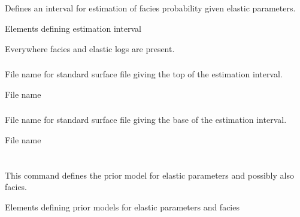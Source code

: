 \subsection{}
 \slist
   \item \Description Defines an interval for estimation of facies probability given elastic parameters.
   \item \Argument Elements defining estimation interval
   \item \Default Everywhere facies and elastic logs are present.
 \elist

\subsubsection{}
 \slist
   \item \Description File name for standard surface file giving the top of the estimation interval.
   \item \Argument File name
   \item \Default
 \elist

\subsubsection{}
 \slist
   \item \Description File name for standard surface file giving the base of the estimation interval.
   \item \Argument File name
   \item \Default
 \elist


\section{}
 \slist
   \item \Description This command defines the prior model for elastic parameters and possibly also facies.
   \item \Argument Elements defining prior models for elastic parameters and facies
   \item \Default
 \elist

